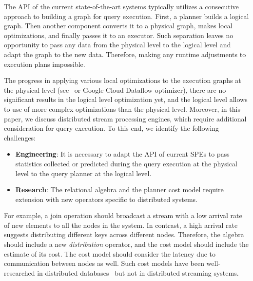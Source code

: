 The API of the current state-of-the-art systems typically utilizes a consecutive approach to building a graph for query execution. First, a planner builds a logical graph. Then another component converts it to a physical graph, makes local optimizations, and finally passes it to an executor.
Such separation leaves no opportunity to pass any data from the physical level to the logical level and adapt the graph to the new data. Therefore, making any runtime adjustments to execution plans impossible. 

The progress in applying various local optimizations to the execution graphs at the physical level (see~\cite{grulich2020grizzly} or Google Cloud Dataflow optimizer), there are no significant results in the logical level optimization yet, and the logical level allows to use of more complex optimizations than the physical level. 
Moreover, in this paper, we discuss distributed stream processing engines, which require additional consideration for query execution. To this end, we identify the following challenges:

\begin{itemize}
    \item \textbf{Engineering}: 
    It is necessary to adapt the API of current SPEs to pass statistics collected or predicted during the query execution at the physical level to the query planner at the logical level.
    
    \item \textbf{Research}: 
    The relational algebra and the planner cost model require extension with new operators specific to distributed systems.
\end{itemize}

For example, a join operation should broadcast a stream with a low arrival rate of new elements to all the nodes in the system. 
In contrast, a high arrival rate suggests distributing different keys across different nodes. 
Therefore, the algebra should include a new \textit{distribution} operator, and the cost model should include the estimate of its cost. The cost model should consider the latency due to communication between nodes as well. Such cost models have been well-researched in distributed databases~\cite{kossmann2000thestate} but not in distributed streaming systems.


